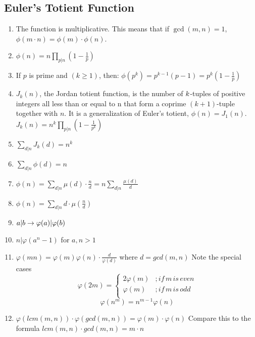 \subsection{Euler’s Totient Function}
\begin{enumerate}[resume]
    \item The function is multiplicative.
          This means that if $\displaystyle \gcd(m, n) = 1$, $\displaystyle \phi(m \cdot n) = \phi(m) \cdot \phi(n)$.
    \item $\displaystyle \phi(n) = n\prod_{p |n}(1 - \frac{1}{p} )$
    \item If $p$ is prime and $(k \geq 1)$, then:
          $\displaystyle \phi(p^k) = p^{k - 1}(p - 1) = p^k(1 - \frac{1}{p})$
    \item $J_k(n)$, the Jordan totient function, is the number of $\displaystyle \displaystyle k$-tuples of positive integers all less than or equal to n that form a coprime $\displaystyle (k + 1)$-tuple together with $n$. It is a generalization of Euler’s totient, $\displaystyle \phi(n) = J_1(n)$.
          \(J_k(n) = n^k\prod_{p |n}(1 - \frac{1}{p^k})\)
    \item $\displaystyle \sum_{d|n}J_k(d) = n^k$
    \item $\displaystyle \sum_{d|n}\phi(d) = n$
    \item $\displaystyle \phi(n) = \sum_{d|n}\mu(d)\cdot\frac{n}{d} = n\sum_{d|n}\frac{\mu(d)}{d}$
    \item $\displaystyle \phi(n) = \sum_{d|n}d\cdot\mu(\frac{n}{d})$
    \item $\displaystyle \displaystyle {a}\vert{b} \to \varphi(a)\vert{\varphi(b)}$
    \item $n\vert{\varphi(a^n - 1)}$ for $\displaystyle a, n > 1$
    \item $\displaystyle \varphi(mn)=\varphi(m)\varphi(n)\cdot\frac{d}{\varphi(d)}$ where $d=gcd(m, n)$
          Note the special cases
          \[\varphi(2m)=
              \begin{cases}
                  2\varphi(m) & ; if \, m  \, is \, even \\
                  \varphi(m)  & ; if \, m \, is \, odd   \\
              \end{cases}\]
          \[\displaystyle \varphi(n^m)=n^{m-1}\varphi(n)\]
    \item $\displaystyle \varphi(lcm(m, n)) \cdot \varphi(gcd(m, n))=\varphi(m) \cdot \varphi(n)$
          Compare this to the formula $lcm(m, n)\cdot gcd(m,n)=m\cdot n$

\end{enumerate}
